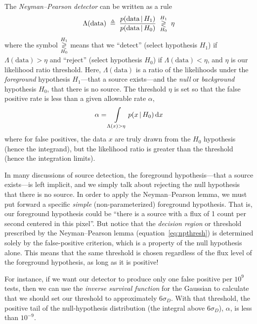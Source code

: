 \documentclass[11pt,letterpaper,linenumbers]{aastex7}
\newcommand{\equationname}{equation}
\newcommand{\eqnref}[1]{\mbox{\equationname~\ref{#1}}}
\newcommand{\sigd}{\sigma_{\scriptscriptstyle D}}
\newcommand{\data}{\ensuremath{\textrm{data}}}
\newcommand{\given}{\,\vert\,}
\begin{document}
The \emph{Neyman--Pearson detector} can be written as a rule
\begin{eqnarray}
  \Lambda(\data) \; \triangleq \; \frac{p(\data \given H_1)}{p(\data \given H_0)} \; \overunderset{H_1}{H_0}{\gtrless} \; \eta
\end{eqnarray}
where the symbol $\overunderset{H_1}{H_0}{\gtrless}$
means that we ``detect''
(select hypothesis $H_1$) if $\Lambda(\data) > \eta$ and ``reject''
(select hypothesis $H_0$) if $\Lambda(\data) < \eta$, and $\eta$ is our likelihood ratio threshold.
Here, $\Lambda(\data)$ is a ratio of the likelihoods under the
\emph{foreground} hypothesis $H_1$---that a source exists---and the
\emph{null} or \emph{background} hypothesis $H_0$, that there is no source.
The threshold $\eta$ is set so that the false positive rate is less than
a given allowable rate $\alpha$,
\begin{eqnarray}
  \alpha = \int_{\Lambda(x) > \eta}\displaylimits p(x \given H_0) \, \textrm{d}x
\label{eq:npthresh}
\end{eqnarray}
where for false positives, the data $x$ are truly drawn from the $H_0$
hypothesis (hence the integrand), but the likelihood ratio is greater
than the threshold (hence the integration limits).


In many discussions of source detection, the foreground
hypothesis---that a source exists---is left implicit, and we simply
talk about rejecting the null hypothesis that there is no source.  In
order to apply the Neyman--Pearson lemma, we must put forward a
specific \emph{simple} (non-parameterized) foreground hypothesis.
That is, our foreground hypothesis could be ``there is a source with a
flux of 1 count per second centered in this pixel''.  But notice that
the \emph{decision region} or threshold prescribed by the
Neyman--Pearson lemma (\eqnref{eq:npthresh}) is determined solely by
the false-positive criterion, which is a property of the null
hypothesis alone.  This means that the same threshold is chosen
regardless of the flux level of the foreground hypothesis, as long as
it is positive!


For instance, if we want our detector to produce only one false
positive per $10^9$ tests, then we can use the \emph{inverse survival
  function} for the Gaussian to calculate that we should set our
threshold to approximately $6 \sigd$.  With that threshold, the
positive tail of the null-hypothesis distribution (the integral above
$6 \sigd$), $\alpha$, is less than $10^{-9}$.
\end{document}
